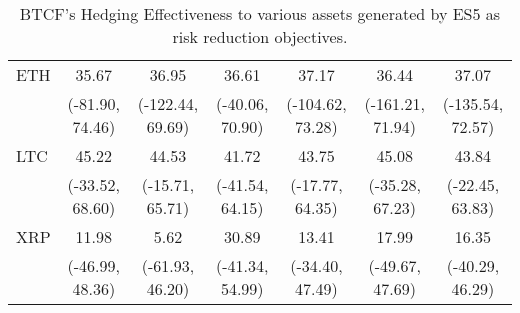 \begin{table}[H]
{\begin{tabular}{lcccccc}
ETH     &             35.67 &             36.95 &             36.61 &             37.17 &             36.44 &             37.07 \\
        &   (-81.90, 74.46) &  (-122.44, 69.69) &   (-40.06, 70.90) &  (-104.62, 73.28) &  (-161.21, 71.94) &  (-135.54, 72.57) \\
LTC     &             45.22 &             44.53 &             41.72 &             43.75 &             45.08 &             43.84 \\
        &   (-33.52, 68.60) &   (-15.71, 65.71) &   (-41.54, 64.15) &   (-17.77, 64.35) &   (-35.28, 67.23) &   (-22.45, 63.83) \\
XRP     &             11.98 &              5.62 &             30.89 &             13.41 &             17.99 &             16.35 \\
        &   (-46.99, 48.36) &   (-61.93, 46.20) &   (-41.34, 54.99) &   (-34.40, 47.49) &   (-49.67, 47.69) &   (-40.29, 46.29) \\
\bottomrule
\end{tabular}}
\caption{BTCF's Hedging Effectiveness to various assets generated by ES5 as risk reduction objectives.}
\label{tab:ES5HE}
\end{table}